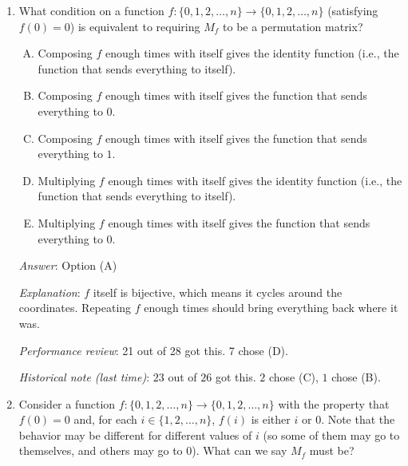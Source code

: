 \documentclass[10pt]{amsart}
\begin{document}
\begin{enumerate}
  {\em Answer}: Option (B)

  {\em Explanation}: The matrix $M_f^r$ is the same as $M_{f \circ
    \dots \circ f}$ where $f$ is composed with itself $r$ times. Thus,
  $M_f^r = 0$ if and only if $M_{f \circ \dots f} = 0$, which means
  that the $r$-fold composite of $f$ is the function that sends
  everything to zero.

  {\em Performance review}: 23 out of 28 got this. 3 chose (A), 2
  chose (E).

  {\em Historical note (last time)}: $23$ out of $26$ got this. $2$
  chose (C), $1$ chose (E).
\item What condition on a function $f: \{ 0,1,2,\dots, n\} \to \{
  0,1,2,\dots,n\}$ (satisfying $f(0) = 0$) is equivalent to requiring
  $M_f$ to be a permutation matrix?

  \begin{enumerate}[(A)]
  \item Composing $f$ enough times with itself gives the identity
    function (i.e., the function that sends everything to itself).
  \item Composing $f$ enough times with itself gives the function that
    sends everything to $0$.
  \item Composing $f$ enough times with itself gives the function that
    sends everything to $1$.
  \item Multiplying $f$ enough times with itself gives the identity
    function (i.e., the function that sends everything to itself).
  \item Multiplying $f$ enough times with itself gives the function
    that sends everything to $0$.
  \end{enumerate}

  {\em Answer}: Option (A)

  {\em Explanation}: $f$ itself is bijective, which means it cycles
  around the coordinates. Repeating $f$ enough times should bring
  everything back where it was.

  {\em Performance review}: 21 out of 28 got this. 7 chose (D).

  {\em Historical note (last time)}: $23$ out of $26$ got this. $2$ chose (C),
  $1$ chose (B).
\item Consider a function $f: \{ 0,1,2,\dots,n \} \to
  \{0,1,2,\dots,n\}$ with the property that $f(0) = 0$ and, for each
  $i \in \{ 1,2,\dots,n\}$, $f(i)$ is either $i$ or $0$. Note that the
  behavior may be different for different values of $i$ (so some of
  them may go to themselves, and others may go to $0$). What can we say
  $M_f$ must be?


\end{enumerate}
\end{document}
